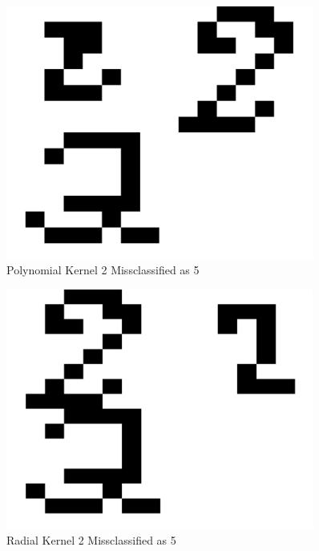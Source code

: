 \documentclass{article}
\begin{document}
\begin{figure}
\centering
\includegraphics[width=0.9\textwidth]{images/test2_5_correct2_class5_a0156.png}
\caption{Polynomial Kernel 2 Missclassified as 5}
\label{poly2errortest}
\end{figure}

\begin{figure}
\centering
\includegraphics[width=0.9\textwidth]{images/test2_5_correct2_class5_radial.png}
\caption{Radial Kernel 2 Missclassified as 5}
\label{radial2errortest}
\end{figure}
\end{document}
